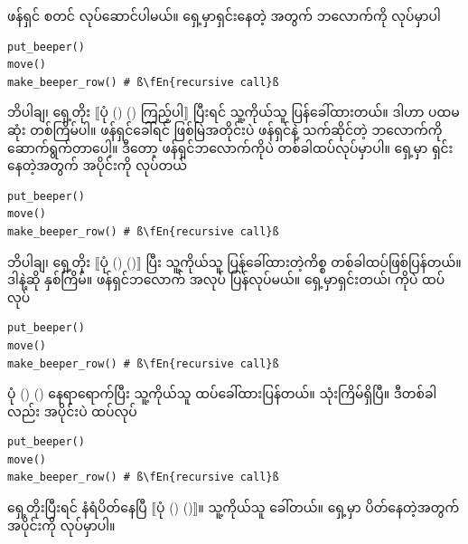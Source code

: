 ဖန်ရှင် စတင် လုပ်ဆောင်ပါမယ်။  ရှေ့မှာရှင်းနေတဲ့ အတွက်  ဘလောက်ကို လုပ်မှာပါ
%
\setlength{\fboxsep}{0pt}
\begin{verbatim}
put_beeper()
move()
make_beeper_row() # ß\fEn{recursive call}ß
\end{verbatim}
%
ဘိပါချ၊ ရှေ့တိုး $\big\llbracket$ပုံ (\fRefNo{\ref{fig:mrofb_recur}}) ()  ကြည့်ပါ$\big\rrbracket$ ပြီးရင် သူ့ကိုယ်သူ  ပြန်ခေါ်ထားတယ်။ ဒါဟာ ပထမဆုံး တစ်ကြိမ်ပါ။ ဖန်ရှင်ခေါ်ရင် ဖြစ်မြဲအတိုင်းပဲ ဖန်ရှင်နဲ့ သက်ဆိုင်တဲ့ ဘလောက်ကို ဆောက်ရွက်တာပေါ့။ ဒီတော့  ဖန်ရှင်ဘလောက်ကိုပဲ တစ်ခါထပ်လုပ်မှာပါ။ ရှေ့မှာ ရှင်းနေတဲ့အတွက်  အပိုင်းကို လုပ်တယ်
%
\setlength{\fboxsep}{0pt}
\begin{verbatim}
put_beeper()
move()
make_beeper_row() # ß\fEn{recursive call}ß
\end{verbatim}
%
ဘိပါချ၊ ရှေ့တိုး $\big\llbracket$ပုံ (\fRefNo{\ref{fig:mrofb_recur}}) ()$\big\rrbracket$ ပြီး သူ့ကိုယ်သူ ပြန်ခေါ်ထားတဲ့ကိစ္စ တစ်ခါထပ်ဖြစ်ပြန်တယ်။ ဒါနဲ့ဆို နှစ်ကြိမ်။ ဖန်ရှင်ဘလောက် အလုပ် ပြန်လုပ်မယ်။ ရှေ့မှာရှင်းတယ်၊  ကိုပဲ ထပ်လုပ်
%
\setlength{\fboxsep}{0pt}
\begin{verbatim}
put_beeper()
move()
make_beeper_row() # ß\fEn{recursive call}ß
\end{verbatim}
%
ပုံ (\fRefNo{\ref{fig:mrofb_recur}}) () နေရာရောက်ပြီး သူ့ကိုယ်သူ ထပ်ခေါ်ထားပြန်တယ်။ သုံးကြိမ်ရှိပြီ။ ဒီတစ်ခါလည်း  အပိုင်းပဲ ထပ်လုပ်
%
\setlength{\fboxsep}{0pt}
\begin{verbatim}
put_beeper()
move()
make_beeper_row() # ß\fEn{recursive call}ß
\end{verbatim}
%
ရှေ့တိုးပြီးရင် နံရံပိတ်နေပြီ $\big\llbracket$ပုံ (\fRefNo{\ref{fig:mrofb_recur}}) ()$\big\rrbracket$။ သူ့ကိုယ်သူ ခေါ်တယ်။ ရှေ့မှာ ပိတ်နေတဲ့အတွက်  အပိုင်းကို လုပ်မှာပါ။

